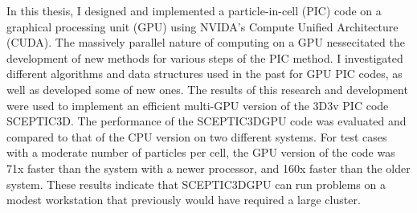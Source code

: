 % 
% 
%
In this thesis, I designed and implemented a particle-in-cell (PIC) code on a graphical processing unit (GPU) using NVIDA's Compute Unified Architecture (CUDA). The massively parallel nature of computing on a GPU nessecitated the development of new methods for various steps of the PIC method. I investigated different algorithms and data structures used in the past for GPU PIC codes, as well as developed some of new ones. The results of this research and development were used to implement an efficient multi-GPU version of the 3D3v PIC code SCEPTIC3D. The performance of the SCEPTIC3DGPU code was evaluated and compared to that of the CPU version on two different systems. For test cases with a moderate number of particles per cell, the GPU version of the code was 71x faster than the system with a newer processor, and 160x faster than the older system. These results indicate that SCEPTIC3DGPU can run problems on a modest workstation that previously would have required a large cluster. 
